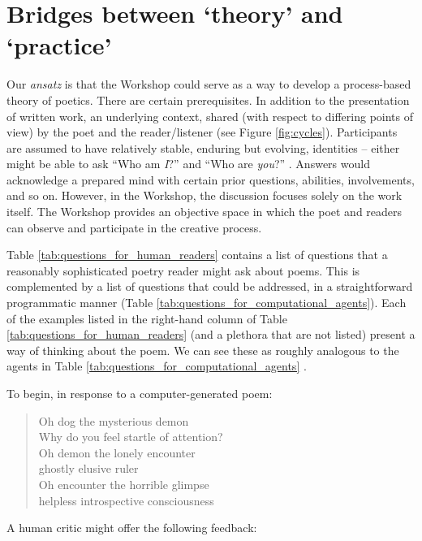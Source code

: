 \section{Bridges between `theory' and `practice'}

Our \emph{ansatz} is that the Workshop could serve as a way to develop a process-based theory of poetics.
There are certain prerequisites.  In addition to the presentation of
written work, an underlying context, shared
(with respect to differing points of view) by the poet and the reader/listener
(see Figure \ref{fig:cycles}).  Participants are assumed to
have relatively stable, enduring but evolving, identities -- either might be able to ask
``Who am \emph{I}?''  and ``Who are \emph{you}?'' \cite[p. 251]{bakhtin1984problems}. 
Answers would acknowledge a prepared mind with certain prior questions, abilities, involvements, and so on.
However, in the Workshop, the discussion focuses solely on the work itself.
The Workshop provides an objective space in which the poet and readers can observe and
participate in the creative process.

Table \ref{tab:questions_for_human_readers} contains a list of questions that a reasonably
sophisticated poetry reader might ask about poems.  This is complemented by a list of
questions that could be addressed, in a straightforward programmatic manner (Table \ref{tab:questions_for_computational_agents}).  
Each of the examples listed in the right-hand column of Table \ref{tab:questions_for_human_readers} (and a plethora
that are not listed) present a way of thinking about the poem.  We can see these as roughly analogous to the agents in Table \ref{tab:questions_for_computational_agents} \cite{minsky2006emotion}.

To begin, in response to a computer-generated poem:

{\itshape
\begin{verse}
%
Oh dog the mysterious demon\\
Why do you feel startle of attention?\\
Oh demon the lonely encounter\\
ghostly elusive ruler\\
Oh encounter the horrible glimpse\\
helpless introspective consciousness\\
\end{verse}
}

A human critic might offer the following feedback:


